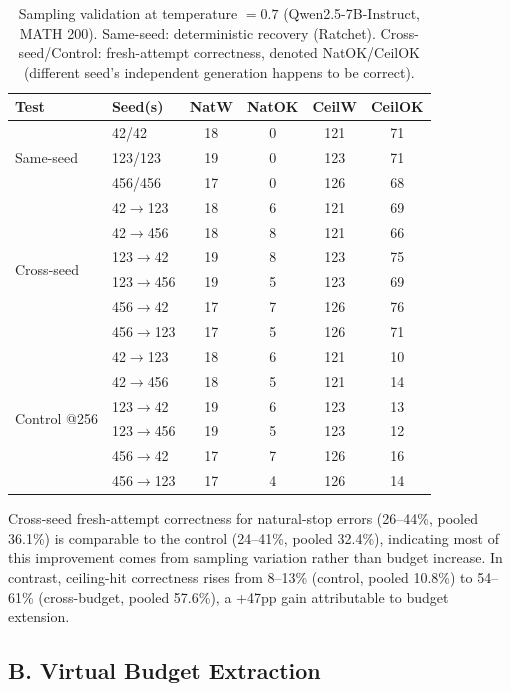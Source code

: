 \documentclass{article}
\begin{document}
\begin{table}[h]
\centering
\caption{Sampling validation at temperature $= 0.7$ (Qwen2.5-7B-Instruct, MATH 200). Same-seed: deterministic recovery (Ratchet). Cross-seed/Control: fresh-attempt correctness, denoted NatOK/CeilOK (different seed's independent generation happens to be correct).}
\label{tab:sampling}
\begin{tabular}{llcccc}
\toprule
\textbf{Test} & \textbf{Seed(s)} & \textbf{NatW} & \textbf{NatOK} & \textbf{CeilW} & \textbf{CeilOK} \\
\midrule
\multirow{3}{*}{Same-seed} & 42/42 & 18 & 0 & 121 & 71 \\
 & 123/123 & 19 & 0 & 123 & 71 \\
 & 456/456 & 17 & 0 & 126 & 68 \\
\midrule
\multirow{6}{*}{Cross-seed} & 42$\to$123 & 18 & 6 & 121 & 69 \\
 & 42$\to$456 & 18 & 8 & 121 & 66 \\
 & 123$\to$42 & 19 & 8 & 123 & 75 \\
 & 123$\to$456 & 19 & 5 & 123 & 69 \\
 & 456$\to$42 & 17 & 7 & 126 & 76 \\
 & 456$\to$123 & 17 & 5 & 126 & 71 \\
\midrule
\multirow{6}{*}{Control @256} & 42$\to$123 & 18 & 6 & 121 & 10 \\
 & 42$\to$456 & 18 & 5 & 121 & 14 \\
 & 123$\to$42 & 19 & 6 & 123 & 13 \\
 & 123$\to$456 & 19 & 5 & 123 & 12 \\
 & 456$\to$42 & 17 & 7 & 126 & 16 \\
 & 456$\to$123 & 17 & 4 & 126 & 14 \\
\bottomrule
\end{tabular}
\end{table}

Cross-seed fresh-attempt correctness for natural-stop errors (26--44\%, pooled 36.1\%) is comparable to the control (24--41\%, pooled 32.4\%), indicating most of this improvement comes from sampling variation rather than budget increase. In contrast, ceiling-hit correctness rises from 8--13\% (control, pooled 10.8\%) to 54--61\% (cross-budget, pooled 57.6\%), a +47pp gain attributable to budget extension.

\subsection*{B. Virtual Budget Extraction}
\end{document}
